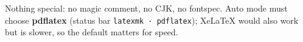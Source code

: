 \documentclass{article}
\begin{document}
Nothing special: no magic comment, no CJK, no fontspec. Auto mode must choose
\textbf{pdflatex} (status bar \texttt{latexmk · pdflatex}); XeLaTeX would also
work but is slower, so the default matters for speed.
\end{document}
